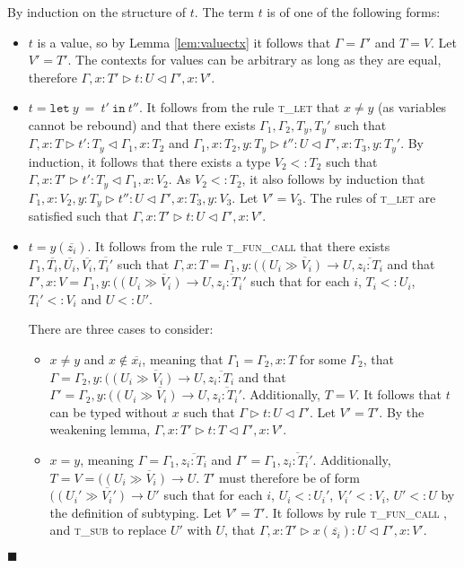\documentclass{article}
\newcommand{\lemref}[1]{Lemma \ref{#1}}
\newcommand{\tlet}{\textsc{t\_let} }
\newcommand{\tfunc}{\textsc{t\_fun\_call} }
\newcommand{\tsub}{\textsc{t\_sub} }
\newcommand{\typerule}[4]{#1 \triangleright #2 : #3 \triangleleft #4}
\newcommand{\funt}[3]{(\overline{(#1 \gg #2) \rightarrow #3}}
\newcommand{\lett}[3]{\mathtt{let}\:#1\:\mathtt{=}\:#2\:\mathtt{in}\:#3}
\newcommand{\qed}{$\blacksquare$}
\newenvironment{proof}{\vspace{1ex}\noindent{\bf Proof}\hspace{0.5em}}
  {\hfill\qed\vspace{1ex}}
\begin{document}
\begin{proof}
By induction on the structure of $t$.
The term $t$ is of one of the following forms:

\begin{itemize}
\item $t$ is a value, so by \lemref{lem:valuectx} it follows that
$\Gamma = \Gamma'$ and $T = V$. Let $V' = T'$.
The contexts for values can be arbitrary as long
as they are equal, therefore $\typerule{\Gamma, x : T'}{t}{U}{\Gamma', x : V'}$.

\item $t = \lett{y}{t'}{t''}$. It follows from the rule \tlet that
$x \neq y$ (as variables cannot be rebound) and that there exists 
$\Gamma_1, \Gamma_2, T_y, T_y'$ such that
$\typerule{\Gamma, x : T}{t'}{T_y}{\Gamma_1, x : T_2}$ and
$\typerule{\Gamma_1, x : T_2, y : T_y}{t''}{U}{\Gamma', x : T_3, y : T_y'}$.
By induction, it follows that there exists a type $V_2 <: T_2$ such that
$\typerule{\Gamma, x : T'}{t'}{T_y}{\Gamma_1, x : V_2}$.
As $V_2 <: T_2$, it also follows by induction that
$\typerule{\Gamma_1, x : V_2, y : T_y}{t''}{U}{\Gamma', x : T_3, y : V_3}$.
Let $V' = V_3$. The rules of \tlet are satisfied such that
$\typerule{\Gamma, x : T'}{t}{U}{\Gamma', x : V'}$.

\item $t = y ( \overline{z_i} )$. 
It follows from the rule \tfunc that there exists
$\Gamma_1, \overline{T_i}, \overline{U_i}, \overline{V_i}, \overline{T_i'}$ 
such that 
$\Gamma, x : T = \Gamma_1, y : \funt{U_i}{V_i}{U}, \overline{z_i : T_i}$
and that
$\Gamma', x : V = \Gamma_1, y : \funt{U_i}{V_i}{U}, \overline{z_i : T_i'}$
such that for each $i$, $T_i <: U_i$, $T_i' <: V_i$ 
and $U <: U'$.

There are three cases to consider:
\begin{itemize}
\item $x \neq y$ and $x \notin \overline{x_i}$, meaning that
$\Gamma_1 = \Gamma_2, x : T$ for some $\Gamma_2$, that
$\Gamma = \Gamma_2, y : \funt{U_i}{V_i}{U}, \overline{z_i : T_i}$
and that $\Gamma' = \Gamma_2, y : \funt{U_i}{V_i}{U}, \overline{z_i : T_i'}$.
Additionally, $T = V$. It follows that $t$ can be typed without $x$
such that $\typerule{\Gamma}{t}{U}{\Gamma'}$. Let $V' = T'$. 
By the weakening lemma, $\typerule{\Gamma, x : T'}{t}{T}{\Gamma', x : V'}$.

\item $x = y$, meaning $\Gamma = \Gamma_1, \overline{z_i : T_i}$ and
$\Gamma' = \Gamma_1, \overline{z_i : T_i'}$. 
Additionally, $T = V = \funt{U_i}{V_i}{U}$.
$T'$ must therefore be of form $\funt{U_i'}{V_i'}{U'}$ 
such that for each $i$, $U_i <: U_i'$, $V_i' <: V_i$, $U' <: U$ by the
definition of subtyping. Let $V' = T'$. 
It follows by rule \tfunc, and \tsub to replace $U'$ with $U$, that
$\typerule{\Gamma, x : T'}{x ( \overline{z_i})}{U}{\Gamma', x : V'}$.


\end{itemize}
\end{itemize}
\end{proof}
\end{document}
